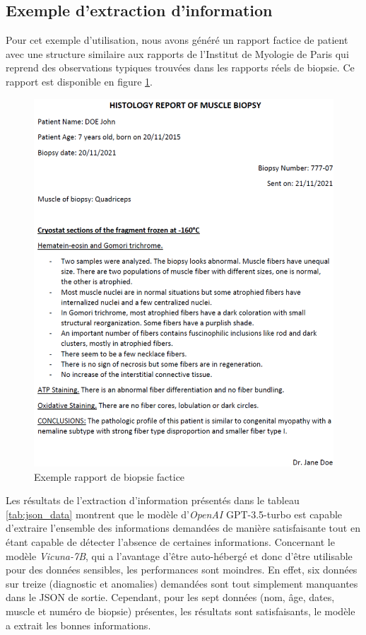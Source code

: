 \subsection{Exemple d'extraction d'information}
Pour cet exemple d'utilisation, nous avons généré un rapport factice de patient avec une structure similaire aux rapports de l'Institut de Myologie de Paris qui reprend des observations typiques trouvées dans les rapports réels de biopsie. Ce rapport est disponible en figure \ref{fig:factice_report}. 
\begin{figure}[!ht]
 \centering
 \includegraphics[width=1\textwidth]{figures/pdf_biopsie.png}
 \caption[Rapport de biopsie factice]{Exemple rapport de biopsie factice}
 \label{fig:factice_report}
\end{figure}

Les résultats de l'extraction d'information présentés dans le tableau \ref{tab:json_data} montrent que le modèle d'\textit{OpenAI} GPT-3.5-turbo est capable d'extraire l'ensemble des informations demandées de manière satisfaisante tout en étant capable de détecter l'absence de certaines informations. Concernant le modèle \textit{Vicuna-7B}, qui a l'avantage d'être auto-hébergé et donc d'être utilisable pour des données sensibles, les performances sont moindres. En effet, six données sur treize (diagnostic et anomalies) demandées sont tout simplement manquantes dans le JSON de sortie. Cependant, pour les sept données (nom, âge, dates, muscle et numéro de biopsie) présentes, les résultats sont satisfaisants, le modèle a extrait les bonnes informations.

